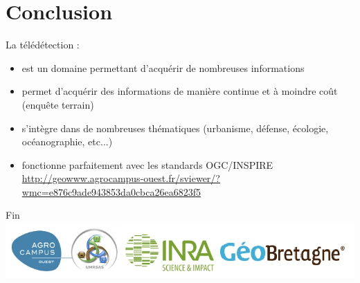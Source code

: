 \documentclass[11pt]{beamer}
\begin{document}
\section{Conclusion}
\begin{frame}{}
La télédétection :
\begin{itemize}
\item est un domaine permettant d'acquérir de nombreuses informations
\item permet d'acquérir des informations de manière continue et à moindre coût (enquête terrain)
\item s’intègre dans de nombreuses thématiques (urbanisme, défense, écologie, océanographie, etc...)
\item fonctionne parfaitement avec les standards OGC/INSPIRE \url{http://geowww.agrocampus-ouest.fr/sviewer/?wmc=e876c9ade943853da0cbca26ea6823f5}
\end{itemize}
\end{frame}

\begin{frame}{}
\centering Fin
\includegraphics[scale=1]{img/logos.jpg}
\end{frame}
\end{document}
